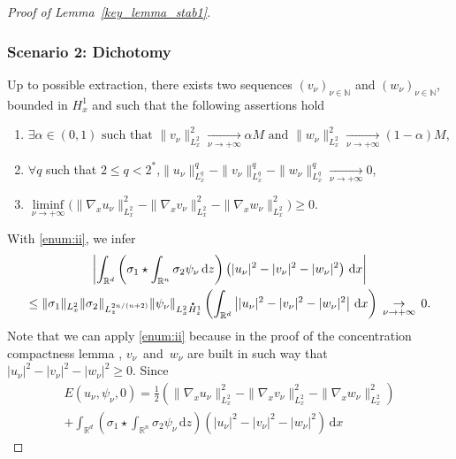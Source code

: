 \documentclass[10pt]{amsart}
\newenvironment{enumeratei}
{\bgroup\def\theenumi{\roman{enumi}}\def\theenumii{\arabic{enumii}}\begin{enumerate}}
{\end{enumerate}\egroup}
\theoremstyle{definition}
\newcommand*{\overbigdot}[1]{%
\accentset{\mbox{\large\bfseries .}}{#1}}
\newenvironment{ProofOf}[1]{\begin{proof}[Proof of #1]}{\end{proof}}
\newcommand{\R}{\mathbb{R}}
\let\ds\displaystyle
\newcommand{\ud}{\, {\mathrm{d}}}
\begin{document}
\begin{ProofOf}{Lemma~\ref{key_lemma_stab1}}
\subsubsection*{Scenario 2: Dichotomy} Up to possible extraction, there exists two sequences $(v_{\nu})_{\nu\in\mathbb N}$ and $(w_{\nu})_{\nu\in\mathbb N}$, bounded in $H_{x}^{1}$
and such that the following assertions hold
\begin{enumeratei}
\item\label{enum:i}
$\ds \exists\alpha\in(0,1)\text{ such that }\|v_{\nu}\|_{L_{x}^{2}}^{2}\underset{\nu\to+\infty}{\to}\alpha M\text{ and }\|w_{\nu}\|_{L_{x}^{2}}^{2}\underset{\nu\to+\infty}{\to}(1-\alpha)M$,
\item
\label{enum:ii}
$\forall q$ such that $2\leq q<2^{*}$,\quad$\ds\|u_{\nu}\|_{L_{x}^{q}}^{q}-\|v_{\nu}\|_{L_{x}^{q}}^{q}-\|w_{\nu}\|_{L_{x}^{q}}^{q}\underset{\nu\to+\infty}{\to}0$,
\item
\label{enum:iii}
$\ds\underset{\nu\to+\infty}{\liminf}\bigl(\|\nabla_{x}u_{\nu}\|_{L_{x}^{2}}^{2}-\|\nabla_{x}v_{\nu}\|_{L_{x}^{2}}^{2}-\|\nabla_{x}w_{\nu}\|_{L_{x}^{2}}^{2}\bigr)\geq0$.
\end{enumeratei}
\noindent
With \eqref{enum:ii}, we infer
\begin{multline}\label{application_ii}
\left|\int_{\R^{d}}\left(\sigma_{1}\star\int_{\R^{n}}\sigma_{2}\psi_{\nu}\ud z\right)\left(|u_{\nu}|^{2}-|v_{\nu}|^{2}-|w_{\nu}|^{2}\right)\ud x\right|\\
\leq\|\sigma_{1}\|_{L_{x}^{2}}\|\sigma_{2}\|_{L_{z}^{2n/(n+2)}}\|\psi_{\nu}\|_{L_{x}^{2}\overbigdot{H}_{z}^{1}}\left(\int_{\R^{d}}\left||u_{\nu}|^{2}-|v_{\nu}|^{2}-|w_{\nu}|^{2}\right|\ud x\right)\,\underset{\nu\to +\infty}{\to}\,0.
\end{multline}
Note that we can apply \eqref{enum:ii} because in the proof of the concentration compactness lemma
\cite[Prop.\,1.7.6, sp. (1.7.11) \& (1.7.12)]{Caze}
\cite[Proof of Lem.\,I.1 \& Lem.\,III.1]{PLLcc1},
$v_{\nu}$~and~$w_{\nu}$ are built in such way that $|u_{\nu}|^{2}-|v_{\nu}|^{2}-|w_{\nu}|^{2}\geq 0$. Since\vspace*{-10pt}
\bgroup
{}
\begin{multline*}
E(u_{\nu},\psi_{\nu},0)=\frac{1}{2}\left(\|\nabla_{x}u_{\nu}\|_{L_{x}^{2}}^{2}-\|\nabla_{x}v_{\nu}\|_{L_{x}^{2}}^{2}-\|\nabla_{x}w_{\nu}\|_{L_{x}^{2}}^{2}\right)\\
+\int_{\R^{d}}\left(\sigma_{1}\star\int_{\R^{n}}\sigma_{2}\psi_{\nu}\ud z\right)\left(|u_{\nu}|^{2}-|v_{\nu}|^{2}-|w_{\nu}|^{2}\right)\ud x

\end{multline*}
\end{ProofOf}
\end{document}
